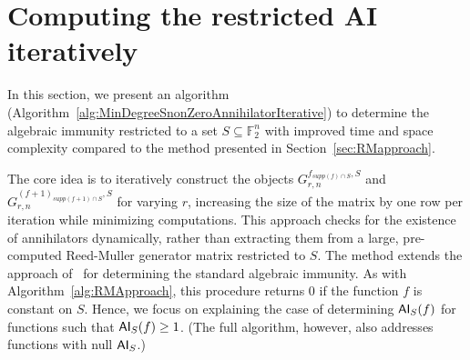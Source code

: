 \documentclass[11pt]{llncs}
\begin{document}
\section{Computing the restricted AI iteratively}\label{sec:IterativeApproach}






In this section, we present an algorithm (Algorithm~\ref{alg:MinDegreeSnonZeroAnnihilatorIterative}) to determine the algebraic immunity restricted to a set $S \subseteq \mathbb{F}_2^n$ with improved time and space complexity compared to the method presented in Section~\ref{sec:RMapproach}. 

The core idea is to iteratively construct the objects $G_{r,n}^{f_{supp\left(f\right) \cap S},S}$ and $G_{r,n}^{\left(f+ 1\right)_{supp\left(f+ 1\right) \cap S},S}$ for varying $r$, increasing the size of the matrix by one row per iteration while minimizing computations. 
This approach checks for the existence of annihilators dynamically, rather than extracting them from a large, pre-computed Reed-Muller generator matrix restricted to $S$. The method extends the approach of~\cite{EC:ACGKMR06} for determining the standard algebraic immunity.
As with Algorithm~\ref{alg:RMApproach}, this procedure returns $0$ if the function $f$ is constant on $S$. Hence, we focus on explaining the case of determining $\mathsf{AI}_S(f)$ for functions such that $\mathsf{AI}_S(f) \geq 1$. (The full algorithm, however, also addresses functions with null $\mathsf{AI}_S$.)
\end{document}
